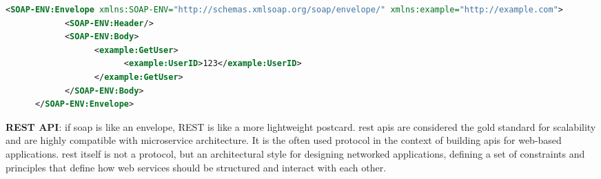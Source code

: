 \begin{lstlisting}[language=XML, caption=Example of a SOAP request, label=lst:soaprequest]
      <SOAP-ENV:Envelope xmlns:SOAP-ENV="http://schemas.xmlsoap.org/soap/envelope/" xmlns:example="http://example.com">
            <SOAP-ENV:Header/>
            <SOAP-ENV:Body>
                  <example:GetUser>
                        <example:UserID>123</example:UserID>
                  </example:GetUser>
            </SOAP-ENV:Body>
      </SOAP-ENV:Envelope>
\end{lstlisting}

\begin{multicols}{2}
      \textbf{REST API}: if \acrshort{soap} is like an envelope, \gls{REST} is like a  more lightweight postcard.
      \acrshort{rest} \acrshort{api}s are considered the gold standard for scalability and are highly compatible with
      microservice architecture. It is the often used protocol in the context of building \acrshort{api}s for web-based
      applications. \acrshort{rest} itself is not a protocol, but an architectural style for designing networked
      applications, defining a set of constraints and principles that define how web services should be structured
      and interact with each other.


\end{multicols}
